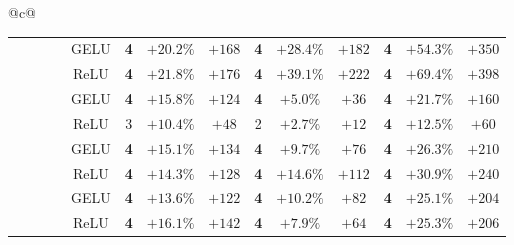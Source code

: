 \begin{tabular}{@{}c@{}}
\begin{tabular}{@{}ccccc|ccccccccc@{}}
\hdashline[1pt/3pt]
\xmark & \cmark & \cmark & \cmark & GELU & \textbf{4} & \textcolor{green!55!black}{$+20.2\%$} & \textcolor{green!55!black}{$+168$} & \textbf{4} & \textcolor{green!55!black}{$+28.4\%$} & \textcolor{green!55!black}{$+182$} & \textbf{4} & \textcolor{green!55!black}{$+54.3\%$} & \textcolor{green!55!black}{$+350$} \\
\xmark & \cmark & \cmark & \cmark & ReLU & \textbf{4} & \textcolor{green!55!black}{$+21.8\%$} & \textcolor{green!55!black}{$+176$} & \textbf{4} & \textcolor{green!55!black}{$+39.1\%$} & \textcolor{green!55!black}{$+222$} & \textbf{4} & \textcolor{green!55!black}{$+69.4\%$} & \textcolor{green!55!black}{$+398$} \\
\midrule
\cmark & \cmark & \xmark & \xmark & GELU & \textbf{4} & \textcolor{green!55!black}{$+15.8\%$} & \textcolor{green!55!black}{$+124$} & \textbf{4} & \textcolor{green!55!black}{$+5.0\%$} & \textcolor{green!55!black}{$+36$} & \textbf{4} & \textcolor{green!55!black}{$+21.7\%$} & \textcolor{green!55!black}{$+160$} \\
\cmark & \cmark & \xmark & \xmark & ReLU & 3 & \textcolor{green!55!black}{$+10.4\%$} & \textcolor{green!55!black}{$+48$} & 2 & \textcolor{green!55!black}{$+2.7\%$} & \textcolor{green!55!black}{$+12$} & \textbf{4} & \textcolor{green!55!black}{$+12.5\%$} & \textcolor{green!55!black}{$+60$} \\
\hdashline[1pt/3pt]
\cmark & \cmark & \xmark & \cmark & GELU & \textbf{4} & \textcolor{green!55!black}{$+15.1\%$} & \textcolor{green!55!black}{$+134$} & \textbf{4} & \textcolor{green!55!black}{$+9.7\%$} & \textcolor{green!55!black}{$+76$} & \textbf{4} & \textcolor{green!55!black}{$+26.3\%$} & \textcolor{green!55!black}{$+210$} \\
\cmark & \cmark & \xmark & \cmark & ReLU & \textbf{4} & \textcolor{green!55!black}{$+14.3\%$} & \textcolor{green!55!black}{$+128$} & \textbf{4} & \textcolor{green!55!black}{$+14.6\%$} & \textcolor{green!55!black}{$+112$} & \textbf{4} & \textcolor{green!55!black}{$+30.9\%$} & \textcolor{green!55!black}{$+240$} \\
\hdashline[1pt/3pt]
\cmark & \cmark & \cmark & \xmark & GELU & \textbf{4} & \textcolor{green!55!black}{$+13.6\%$} & \textcolor{green!55!black}{$+122$} & \textbf{4} & \textcolor{green!55!black}{$+10.2\%$} & \textcolor{green!55!black}{$+82$} & \textbf{4} & \textcolor{green!55!black}{$+25.1\%$} & \textcolor{green!55!black}{$+204$} \\
\cmark & \cmark & \cmark & \xmark & ReLU & \textbf{4} & \textcolor{green!55!black}{$+16.1\%$} & \textcolor{green!55!black}{$+142$} & \textbf{4} & \textcolor{green!55!black}{$+7.9\%$} & \textcolor{green!55!black}{$+64$} & \textbf{4} & \textcolor{green!55!black}{$+25.3\%$} & \textcolor{green!55!black}{$+206$} \\

\end{tabular}
\end{tabular}
